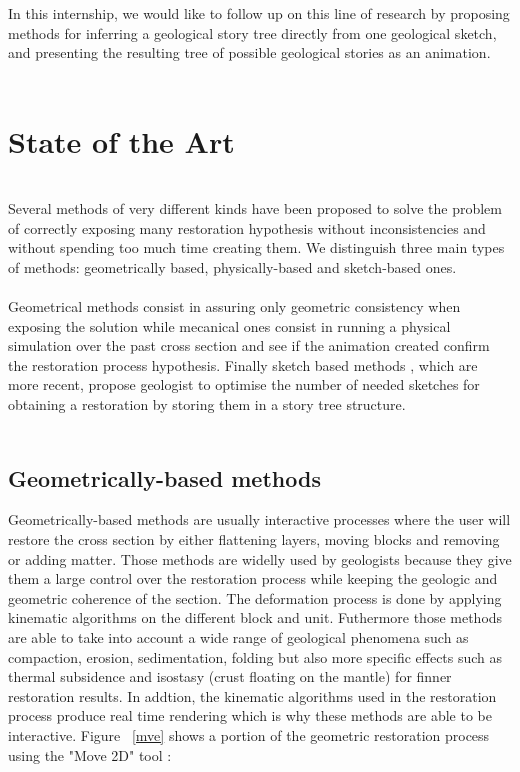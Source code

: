 \documentclass[12pt, a4paper]{report} %
\begin{document}
In this internship, we would like to follow up on this line of research by proposing methods for inferring a geological story tree directly from one geological sketch, and presenting the resulting tree of possible geological stories as an animation.\\\\

\chapter{State of the Art}\\

Several methods of very different kinds have been proposed to solve the problem of correctly exposing many restoration hypothesis without inconsistencies and without spending too much time creating them. We distinguish three main types of methods: geometrically based, physically-based and sketch-based ones.\\\\
Geometrical methods consist in assuring only geometric consistency when exposing the solution while mecanical ones consist in running a physical simulation over the past cross section and see if the animation created confirm the restoration process hypothesis. Finally sketch based methods , which are more recent, propose geologist to optimise the number of needed sketches for obtaining a restoration by storing them in a story tree structure.\\\\

\section{Geometrically-based methods}

Geometrically-based methods are usually interactive processes where the user will restore the cross section by either flattening layers, moving blocks and removing or adding matter.
Those methods are widelly used by geologists because they give them a large control over the restoration process while keeping the geologic and geometric coherence of the section.  The deformation process is done by applying  kinematic algorithms on the different block and unit. Futhermore those methods are able to take into account a wide range of geological phenomena such as compaction, erosion, sedimentation, folding but also more specific effects such as thermal subsidence and isostasy (crust floating on the mantle) \cite{Isostasy} for finner restoration results. In addtion, the kinematic algorithms used in the restoration process produce real time rendering which is why these methods are able to be interactive.
Figure ~\ref{mve} shows a portion of the geometric restoration process using the "Move 2D" tool \cite{Move}:
\end{document}

